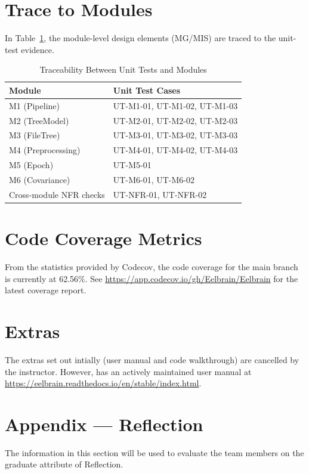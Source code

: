 \documentclass[12pt, titlepage]{article}
\begin{document}
\section{Trace to Modules}

In Table~\ref{tab:unit_test_module_trace}, the module-level design elements (MG/MIS) are traced to the unit-test evidence.

\begin{table}[h]
\centering
\begin{tabularx}{0.9\textwidth}{p{2.2cm}X}
\toprule
    \textbf{Module} & \textbf{Unit Test Cases} \\
\midrule
    M1 (Pipeline) & UT-M1-01, UT-M1-02, UT-M1-03 \\
    M2 (TreeModel) & UT-M2-01, UT-M2-02, UT-M2-03 \\
    M3 (FileTree) & UT-M3-01, UT-M3-02, UT-M3-03 \\
    M4 (Preprocessing) & UT-M4-01, UT-M4-02, UT-M4-03 \\
    M5 (Epoch) & UT-M5-01 \\
    M6 (Covariance) & UT-M6-01, UT-M6-02 \\
    Cross-module NFR checks & UT-NFR-01, UT-NFR-02 \\
\bottomrule
\end{tabularx}
\caption{Traceability Between Unit Tests and Modules}
\label{tab:unit_test_module_trace}
\end{table}


\section{Code Coverage Metrics}

From the statistics provided by Codecov, the code coverage for the main branch is currently at 62.56\%. See \url{https://app.codecov.io/gh/Eelbrain/Eelbrain} for the latest coverage report.


\section{Extras}

The extras set out intially (user manual and code walkthrough) are cancelled by the instructor. However, \progname{} has an actively maintained user manual at \url{https://eelbrain.readthedocs.io/en/stable/index.html}.





\newpage{}
\section*{Appendix --- Reflection}

The information in this section will be used to evaluate the team members on the
graduate attribute of Reflection.


\end{document}
